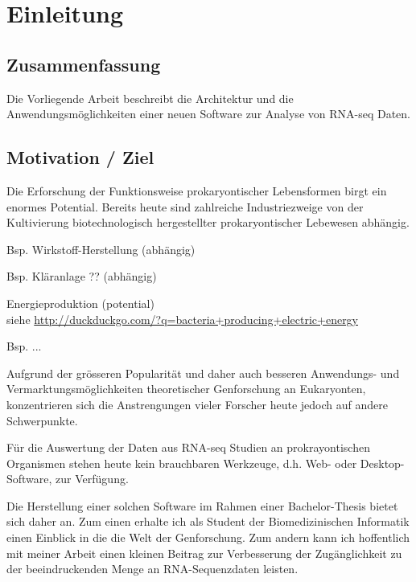 \documentclass[a4paper]{thesis}
\begin{document}

\renewcommand\contentsname{Inhalt}
\tableofcontents
\listoftodos
\newpage

\section{Einleitung}

\subsection{Zusammenfassung}

Die Vorliegende Arbeit beschreibt die Architektur und die
Anwendungs\-möglichkeiten einer neuen Software zur Analyse von RNA-seq Daten.

\subsection{Motivation / Ziel}

Die Erforschung der Funktionsweise prokaryontischer Lebensformen birgt ein
enormes Potential. Bereits heute sind zahlreiche Industriezweige von der
Kultivierung biotechnologisch hergestellter prokaryontischer Lebewesen
abhängig.

\begin{list}{-}{}
 \item Bsp. Wirkstoff-Herstellung (abhängig)
 \item Bsp. Kläranlage ?? (abhängig)
 \item Energieproduktion (potential)
       \\siehe \url{http://duckduckgo.com/?q=bacteria+producing+electric+energy}
 \item Bsp. ... 
\end{list}

Aufgrund der grösseren Popularität und daher auch besseren
Anwendungs- und Vermarktungsmöglichkeiten theoretischer Genforschung an
Eukaryonten, konzentrieren sich die Anstrengungen vieler Forscher heute
jedoch auf andere Schwerpunkte.

Für die Auswertung der Daten aus RNA-seq Studien an prokrayontischen
Organismen stehen heute kein brauchbaren Werkzeuge, d.h.
Web- oder Desktop- Software, zur Verfügung.

Die Herstellung einer solchen Software im Rahmen einer Bachelor-Thesis
bietet sich daher an. Zum einen erhalte ich als Student der Biomedizinischen
Informatik einen Einblick in die die Welt der Genforschung. Zum andern kann ich
hoffentlich mit meiner Arbeit einen kleinen Beitrag zur Verbesserung der
Zugänglichkeit zu der beeindruckenden Menge an RNA-Sequenzdaten leisten.
\end{document}
